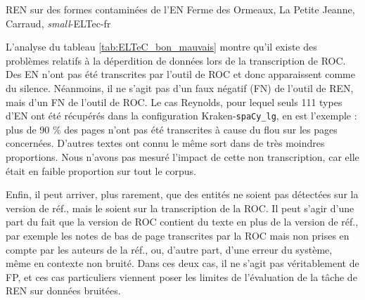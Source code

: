 \begin{table}[h!]
\small
    \centering
    
    \caption{REN sur des formes contaminées de l'EN \og{}Ferme des Ormeaux\fg{}, {\normalfont La Petite Jeanne}, Carraud, \textit{small}-ELTec-fr}
    \label{tab:EN_contamines_Variantes}
\end{table}

L'analyse du tableau \ref{tab:ELTeC_bon_mauvais} montre qu'il existe des problèmes relatifs à la déperdition de données lors de la transcription de ROC. Des EN n'ont pas été transcrites par l'outil de ROC et donc apparaissent comme du silence. Néanmoins, il ne s'agit pas d'un faux négatif (FN) de l'outil de REN, mais d'un FN de l'outil de ROC. Le cas Reynolds, pour lequel seuls 111 types d'EN ont été récupérés dans la configuration Kraken-\texttt{spaCy\_lg}, en est l'exemple : plus de 90 \% des pages n'ont pas été transcrites à cause du flou sur les pages concernées. D'autres textes ont connu le même sort dans de très moindres proportions. Nous n'avons pas mesuré l'impact de cette non transcription, car elle était en faible proportion sur tout le corpus.


Enfin, il peut arriver, plus rarement, que des entités ne soient pas détectées sur la version de réf., mais le soient sur la transcription de la ROC. Il peut s'agir d'une part du fait que la version de ROC contient du texte en plus de la version de réf., par exemple les notes de bas de page transcrites par la ROC mais non prises en compte par les auteurs de la réf., ou, d'autre part,  d’une erreur du système, même en contexte non bruité. Dans ces deux cas, il ne s’agit pas véritablement de FP, et ces cas particuliers viennent poser les limites de l'évaluation de la tâche de REN sur données bruitées.


